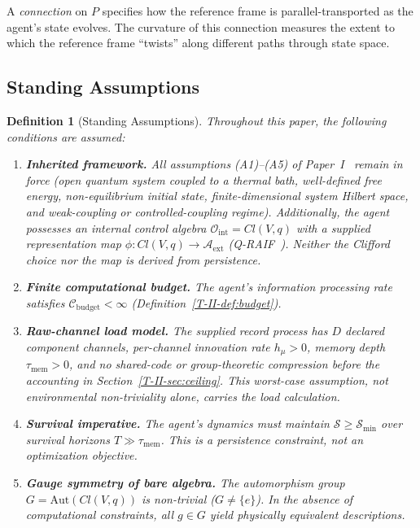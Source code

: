 \documentclass[12pt,a4paper,openany]{book}
\newtheorem{definition}[theorem]{Definition}
\begin{document}
A \emph{connection} on $P$ specifies how the reference frame
is parallel-transported as the agent's state evolves.
The curvature of this connection measures the extent to
which the reference frame ``twists'' along different paths
through state space.

\subsection{Standing Assumptions}
\label{T-II-subsec:standing}

\begin{definition}[Standing Assumptions]
\label{T-II-def:assumptions_B}
Throughout this paper, the following conditions are assumed:
\begin{enumerate}
\item[\textup{(B1)}] \textbf{Inherited framework.}
  All assumptions (A1)--(A5) of
  Paper~I~\cite{Liu2026TDOME_I} remain in force
  (open quantum system coupled to a thermal bath,
  well-defined free energy, non-equilibrium initial state,
  finite-dimensional system Hilbert space,
  and weak-coupling or controlled-coupling regime).
  Additionally, the agent possesses an internal control
  algebra $\mathcal{O}_{\mathrm{int}} = Cl(V,q)$
  with a supplied representation map
  $\phi:Cl(V,q)\to\mathcal A_{\mathrm{ext}}$
  (Q-RAIF~\cite{Liu2026QRAIF_C}).  Neither the Clifford choice nor
  the map is derived from persistence.
\item[\textup{(B2)}] \textbf{Finite computational budget.}
  The agent's information processing rate satisfies
  $\mathcal{C}_{\mathrm{budget}} < \infty$
  (Definition~\ref{T-II-def:budget}).
\item[\textup{(B3)}] \textbf{Raw-channel load model.}
  The supplied record process has $D$ declared component channels,
  per-channel innovation rate $h_\mu>0$, memory depth
  $\tau_{\mathrm{mem}}>0$, and no shared-code or group-theoretic
  compression before the accounting in Section~\ref{T-II-sec:ceiling}.
  This worst-case assumption, not environmental non-triviality alone,
  carries the load calculation.
\item[\textup{(B4)}] \textbf{Survival imperative.}
  The agent's dynamics must maintain
  $\mathcal{S} \geq \mathcal{S}_{\min}$
  over survival horizons
  $T \gg \tau_{\mathrm{mem}}$.
  This is a persistence constraint, not an optimization
  objective.
\item[\textup{(B5)}] \textbf{Gauge symmetry of bare
  algebra.}
  The automorphism group $G = \mathrm{Aut}(Cl(V,q))$
  is non-trivial ($G \neq \{e\}$).
  In the absence of computational constraints, all
  $g \in G$ yield physically equivalent descriptions.
\end{enumerate}
\end{definition}
\end{document}
